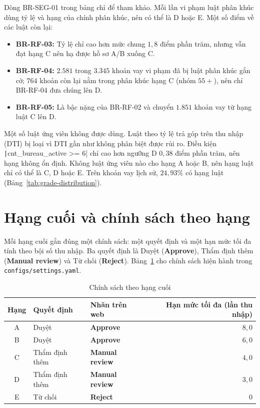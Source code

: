 Dòng BR-SEG-01 trong bảng chỉ để tham khảo. Mỗi lần vi phạm luật phân khúc dùng tỷ lệ và hạng của chính phân khúc, nên có thể là D hoặc E. Một số điểm về các luật còn lại:
\begin{itemize}[topsep=0pt, itemsep=1pt]
	\item \textbf{BR-RF-03:} Tỷ lệ chỉ cao hơn mức chung $1{,}8$ điểm phần trăm, nhưng vẫn đạt hạng C nên hạ được hồ sơ A/B xuống C.
	\item \textbf{BR-RF-04:} $2.581$ trong $3.345$ khoản vay vi phạm đã bị luật phân khúc gắn cờ; $764$ khoản còn lại nằm trong phân khúc hạng C (nhóm $55+$), nên chỉ BR-RF-04 đưa chúng lên D.
	\item \textbf{BR-RF-05:} Là bậc nặng của BR-RF-02 và chuyển $1.851$ khoản vay từ hạng luật C lên D.
\end{itemize}

Một số luật ứng viên không được dùng. Luật theo tỷ lệ trả góp trên thu nhập (DTI) bị loại vì DTI gần như không phân biệt được rủi ro. Điều kiện \texttt|cnt_bureau_active >= 6| chỉ cao hơn ngưỡng D $0{,}38$ điểm phần trăm, nên hạng không ổn định. Không luật ứng viên nào cho hạng A hoặc B, nên hạng luật chỉ có thể là C, D hoặc E. Trên khoản vay lịch sử, $24{,}93\%$ có hạng luật (Bảng~\ref{tab:grade-distribution}).

\section{Hạng cuối và chính sách theo hạng}
\label{sec:dss-policy}

Mỗi hạng cuối gắn đúng một chính sách: một quyết định và một hạn mức tối đa tính theo bội số thu nhập. Ba quyết định là Duyệt (\textbf{Approve}), Thẩm định thêm (\textbf{Manual review}) và Từ chối (\textbf{Reject}). Bảng~\ref{tab:policy-grade} cho chính sách hiện hành trong \texttt{configs/settings.yaml}.

\begin{table}[H]
	\centering
	\caption{Chính sách theo hạng cuối}
	\label{tab:policy-grade}
	\footnotesize
	\begin{tabular}{c l l r}
		\toprule
		\textbf{Hạng} & \textbf{Quyết định} & \textbf{Nhãn trên web} & \textbf{Hạn mức tối đa (lần thu nhập)} \\
		\midrule
		A             & Duyệt               & \textbf{Approve}       & $8{,}0$                                \\
		B             & Duyệt               & \textbf{Approve}       & $6{,}0$                                \\
		C             & Thẩm định thêm      & \textbf{Manual review} & $4{,}0$                                \\
		D             & Thẩm định thêm      & \textbf{Manual review} & $3{,}0$                                \\
		E             & Từ chối             & \textbf{Reject}        & $0$                                    \\
		\bottomrule
	\end{tabular}
\end{table}


